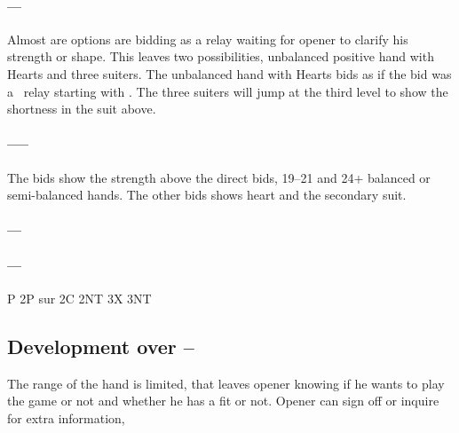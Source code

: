 \paragraph{\bid{1\CS}–\bid{1\DS}–\bid{1\HS}}
Almost are options are bidding \bid{1\SpS} as a relay waiting for opener to clarify his strength or shape. This leaves two possibilities, unbalanced positive hand with Hearts and three suiters. The unbalanced hand with Hearts bids as if the \bid{1\HS} bid was a \lambdaRelay\ relay starting with \bid{2\CS}. The three suiters will jump at the third level to show the shortness in the suit above. 
\paragraph{\bid{1\CS}–\bid{1\DS}–\bid{1\HS}–\bid{1\SpS}}
The bids  show the strength above the direct bids, 19–21 and 24+ balanced or semi-balanced hands. The other bids shows heart and the secondary suit.
\paragraph{\bid{1\CS}–\bid{1\DS}–\bid{1\SpS}}
\paragraph{\bid{1\CS}–\bid{1\DS}–\bid{2\HS/\SpS}}
P
2P sur 2C
2NT
3X
3NT
\subsection{Development over \bid{1\CS}–\bid{1\NT}}
The range of the hand is limited, that leaves opener knowing if he wants to play the game or not and whether he has a fit or not. Opener can sign off or inquire for extra information,
